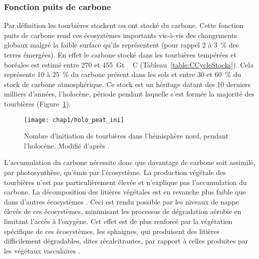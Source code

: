 \subsubsection{Fonction puits de carbone}
Par définition les tourbières stockent ou ont stocké du carbone.
Cette fonction puits de carbone rend ces écosystèmes importants vis-à-vis des changements globaux malgré la faible surface qu'ils représentent (pour rappel 2 à \SI{3}{\percent} des terres émergées).
En effet le carbone stocké dans les tourbières tempérées et boréales est estimé entre 270 et \SI{455}{\giga\tonne\,C} (Tableau~\ref{table:CCycleStocks}).
Cela représente 10 à \SI{25}{\percent} du carbone présent dans les sols et entre 30 et \SI{60}{\percent} du stock de carbone atmosphérique.
Ce stock est un héritage datant des 10 derniers milliers d'années, l'holocène, période pendant laquelle s'est formée la majorité des tourbières \citep{yu2010,macdonald2006} (Figure~\ref{fig:holo_peat_ini}).

\begin{figure}
\centering
\texttt{[image: chap1/holo\_peat\_ini]}
\caption{Nombre d'initiation de tourbières dans l'hémisphère nord, pendant l'holocène. Modifié d'après \citep{macdonald2006}.}
\label{fig:holo_peat_ini}
\end{figure}

L'accumulation du carbone nécessite donc que davantage de carbone soit assimilé, par photosynthèse, qu'émis par l'écosystème.
La production végétale des tourbières n'est pas particulièrement élevée \citep{huc1980} et n'explique pas l'accumulation du carbone.
La décomposition des litières végétales est en revanche plus faible que dans d'autres écosystèmes \citep{rydin2013a}.
Ceci est rendu possible par les niveaux de nappe élevés de ces écosystèmes, minimisant les processus de dégradation aérobie en limitant l'accès à l'oxygène.
Cet effet est de plus renforcé par la végétation spécifique de ces écosystèmes, les sphaignes, qui produisent des litières difficilement dégradables, dites récalcitrantes, par rapport à celles produites par les végétaux vasculaires \citep{hobbie1996,liu2000,bragazza2007}.

